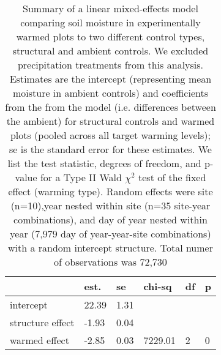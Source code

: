 \documentclass{article}
\begin{document}
\begin{table}[ht]
\centering
\caption{Summary of a linear mixed-effects model comparing soil moisture in experimentally warmed plots to two different control types, structural and ambient controls. We excluded precipitation treatments from this analysis. Estimates are the intercept (representing mean moisture in ambient controls)  and coefficients from the from the model (i.e. differences between the ambient) for structural controls and warmed plots (pooled across all target warming levels); se is the standard error for these estimates. We list the test statistic, degrees of freedom, and p-value for a Type II Wald $\chi^{2}$ test of the fixed effect (warming type). Random effects were site (n=10),year nested within site (n=35 site-year combinations), and day of year nested within year (7,979 day of year-year-site combinations) with a random intercept structure. Total numer of observations was 72,730} 
\label{table:warmsoilmois}
\begin{tabular}{|p{}|p{}p{}p{}p{}p{}|}
  \hline
 & est. & se & chi-sq & df & p \\ 
  \hline
intercept & 22.39 & 1.31 &  &  &  \\ 
  structure effect & -1.93 & 0.04 &  &  &  \\ 
  warmed effect & -2.85 & 0.03 & 7229.01 & 2 & 0 \\ 
   \hline
\end{tabular}
\end{table}
\end{document}
